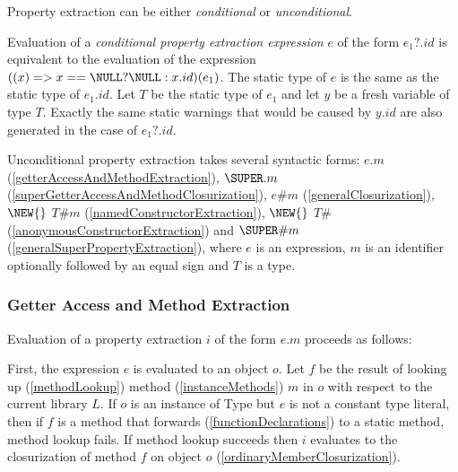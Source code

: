 \documentclass{article}
\newcommand{\code}[1]{{\sf #1}}
\begin{document}

Property extraction can be either {\em conditional} or {\em unconditional}.


Evaluation of a {\em conditional property extraction expression} $e$ of the form $e_1?.id$  is equivalent to the evaluation of the expression  $((x) => x == \NULL ? \NULL : x.id)(e_1)$. The static type of $e$ is the same as the static type of $e_1.id$. Let $T$ be the static type of $e_1$ and let $y$ be a fresh variable of type $T$. Exactly the same static warnings that would be caused by $y.id$ are also generated in the case of $e_1?.id$.


\LMHash{}
Unconditional property extraction takes several syntactic forms: $e.m$ (\ref{getterAccessAndMethodExtraction}), $\SUPER.m$ (\ref{superGetterAccessAndMethodClosurization}), $e\#m$ (\ref{generalClosurization}), $\NEW{}$ $T\#m$ (\ref{namedConstructorExtraction}), $\NEW{}$ $T\#$ (\ref{anonymousConstructorExtraction}) and $\SUPER\#m$ (\ref{generalSuperPropertyExtraction}), where $e$ is an expression, $m$ is an identifier optionally followed by an equal sign and $T$ is a type.

\subsubsection{Getter Access and Method Extraction}

\LMHash{}
Evaluation of a property extraction $i$ of the form $e.m$ proceeds as follows:

\LMHash{}
First, the expression $e$ is evaluated to an object $o$. Let $f$ be the result of looking up (\ref{methodLookup}) method  (\ref{instanceMethods}) $m$ in $o$ with respect to the current library $L$.  If $o$ is an instance of \code{Type} but $e$ is not a constant type literal, then if $f$ is a method that forwards (\ref{functionDeclarations}) to a static method,  method lookup fails. If method lookup succeeds then $i$ evaluates to the closurization of method $f$ on object $o$ (\ref{ordinaryMemberClosurization}).  
\end{document}
